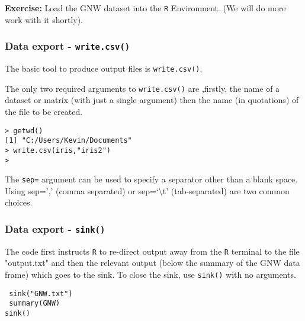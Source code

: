 \documentclass[a4paper,12pt]{article}
\begin{document}
\bigskip
\noindent \textbf{Exercise:} Load the GNW dataset into the \texttt{R} Environment. (We will do more work with it shortly).

\subsubsection{Data export - \texttt{write.csv()}}
The basic tool to produce output files is \texttt{write.csv()}.

The only two required arguments to \texttt{write.csv()} are ,firstly, the name of a dataset or matrix (with just a single argument) then the name (in quotations) of the file to be created.

\begin{framed}
\begin{verbatim}
> getwd()
[1] "C:/Users/Kevin/Documents"
> write.csv(iris,"iris2")
> 
\end{verbatim}
\end{framed}



The  \texttt{sep=} argument can be used to specify a separator other than a blank space. Using sep=',' (comma separated) or sep=`\textbackslash t' (tab-separated) are two common choices.



\subsubsection{Data export - \texttt{sink()}}


The code first instructs \texttt{R} to re-direct output away from the \texttt{R} terminal to the file "output.txt" and
then the relevant output  (below the summary of the GNW data frame) which goes to the sink.
To close the sink, use
\texttt{sink()} with no arguments.

\begin{framed}
\begin{verbatim}
 sink("GNW.txt")
 summary(GNW)
sink()
\end{verbatim}
\end{framed}
\end{document}

